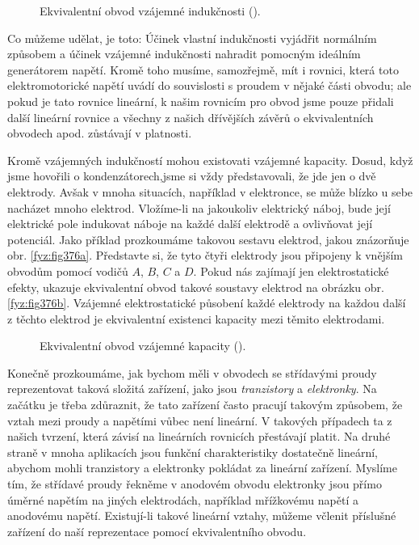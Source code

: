   \begin{figure}[ht!] %
    \centering
    \caption{Ekvivalentní obvod vzájemné indukčnosti
             (\cite[s.~412]{Feynman02}).}
    \label{fyz:fig375}
  \end{figure}

  Co můžeme udělat, je toto: Účinek vlastní indukčnosti vyjádřit normálním způsobem a účinek 
  vzájemné indukčnosti nahradit pomocným ideálním generátorem napětí. Kromě toho musíme, 
  samozřejmě, mít i rovnici, která toto elektromotorické napětí uvádí do souvislosti s proudem v 
  nějaké části obvodu; ale pokud je tato rovnice lineární, k našim rovnicím pro obvod jsme pouze 
  přidali další lineární rovnice a všechny z našich dřívějších závěrů o ekvivalentních obvodech 
  apod. zůstávají v platnosti. 

  Kromě vzájemných indukčností mohou existovati vzájemné kapacity. Dosud, když jsme hovořili o 
  kondenzátorech,jsme si vždy představovali, že jde jen o dvě elektrody. Avšak v mnoha situacích, 
  například v elektronce, se může blízko u sebe nacházet mnoho elektrod. Vložíme-li na jakoukoliv 
  elektrický náboj, bude její elektrické pole indukovat náboje na každé další elektrodě a 
  ovlivňovat její potenciál. Jako příklad prozkoumáme takovou sestavu elektrod, jakou znázorňuje 
  obr. \ref{fyz:fig376a}. Představte si, že tyto čtyři elektrody jsou připojeny k vnějším obvodům 
  pomocí vodičů \(A\), \(B\), \(C\) a \(D\). Pokud nás zajímají jen elektrostatické efekty, ukazuje 
  ekvivalentní obvod takové soustavy elektrod na obrázku obr. \ref{fyz:fig376b}. Vzájemné 
  elektrostatické působení každé elektrody na každou další z těchto elektrod je ekvivalentní 
  existenci kapacity mezi těmito elektrodami.
  
  \begin{figure}[ht!] %
    \centering
    \caption{Ekvivalentní obvod vzájemné kapacity
             (\cite[s.~415]{Feynman02}).}
    \label{fyz:fig376}
  \end{figure}

  Konečně prozkoumáme, jak bychom měli v obvodech se střídavými proudy reprezentovat taková složitá 
  zařízení, jako jsou \emph{tranzistory} a \emph{elektronky}. Na začátku je třeba zdůraznit, že 
  tato zařízení často pracují takovým způsobem, že vztah mezi proudy a napětími vůbec není 
  lineární. V takových případech ta z našich tvrzení, která závisí na lineárních rovnicích 
  přestávají platit. Na druhé straně v mnoha aplikacích jsou funkční charakteristiky dostatečně 
  lineární, abychom mohli tranzistory a elektronky pokládat za lineární zařízení. Myslíme tím, že 
  střídavé proudy řekněme v anodovém obvodu elektronky jsou přímo úměrné napětím na jiných 
  elektrodách, například mřížkovému napětí a anodovému napětí. Existují-li takové lineární vztahy, 
  můžeme včlenit příslušné zařízení do naší reprezentace pomocí ekvivalentního obvodu.

